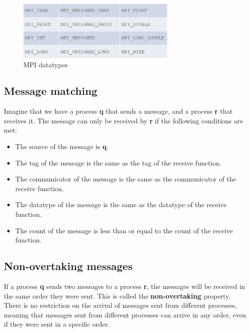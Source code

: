 \begin{figure}[H]
    \centering
    \includegraphics[width=0.7\textwidth]{figures/MPI_datatypes.png}
    \caption{MPI datatypes}
    \label{fig:mpi_datatypes}
\end{figure}


\subsection{Message matching}

Imagine that we have a process \textbf{q} that sends a message, and a process \textbf{r}
that receives it. The message can only be received by \textbf{r} if the following conditions
are met:
\begin{itemize}
    \item The source of the message is \textbf{q}.
    \item The tag of the message is the same as the tag of the receive function. 
    \item The communicator of the message is the same as the communicator of the receive function.
    \item The datatype of the message is the same as the datatype of the receive function.
    \item The count of the message is less than or equal to the count of the receive function.
\end{itemize}

\subsection{Non-overtaking messages}

If a process \textbf{q} sends two messages to a process \textbf{r}, the messages will be
received in the same order they were sent. This is called the \textbf{non-overtaking} property.\\

There is no restriction on the arrival of messages sent from different processes, meaning that
messages sent from different processes can arrive in any order, even if they were sent in a
specific order.

